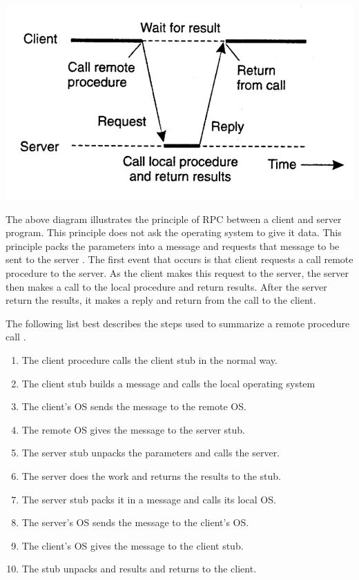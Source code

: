 \documentclass{article}
\begin{document}
\includegraphics[scale=0.35]{XML-RPC.png}

The above diagram illustrates the principle of RPC between a client and server program. This principle does not ask the operating system to give it data. This principle packs the parameters into a message and requests that message to be sent to the server \cite{tanenbaum_steen_2007}. The first event that occurs is that client requests a call remote procedure to the server. As the client makes this request to the server, the server then makes a call to the local procedure and return results. After the server return the results, it makes a reply and return from the call to the client. 

\par

The following list best describes the steps used to summarize a remote procedure call \cite{tanenbaum_steen_2007}.

\begin{enumerate}
\item The client procedure calls the client stub in the normal way.
\item The client stub builds a message and calls the local operating system
\item The client's OS sends the message to the remote OS.
\item The remote OS gives the message to the server stub.
\item The server stub unpacks the parameters and calls the server.
\item The server does the work and returns the results to the stub.
\item The server stub packs it in a message and calls its local OS.
\item The server's OS sends the message to the client's OS.
\item The client's OS gives the message to the client stub.
\item The stub unpacks and results and returns to the client.
\end{enumerate}
\end{document}
